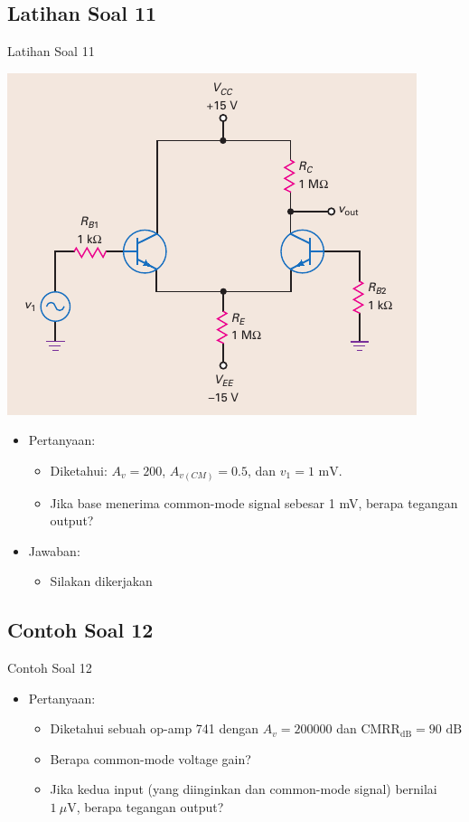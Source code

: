 \documentclass[aspectratio=169]{beamer}
\begin{document}
\subsection{Latihan Soal 11}
\begin{frame}{Latihan Soal 11}
	\begin{multicols}{2}
		\begin{center}
			\includegraphics[height=0.7\textheight]{gambar/01.fig22}
		\end{center}
		\columnbreak
		\begin{itemize}
			\item Pertanyaan:
			\begin{itemize}
				\item Diketahui: $ A_v = 200 $, $ A_{v(CM)} = 0.5 $, dan $ v_1 = 1 \text{ mV} $.
				\item Jika base menerima common-mode signal sebesar 1 mV, berapa tegangan output?
			\end{itemize}
			\item Jawaban:
			\begin{itemize}
				\item Silakan dikerjakan
			\end{itemize}
		\end{itemize}
	\end{multicols}
\end{frame}

\subsection{Contoh Soal 12}
\begin{frame}{Contoh Soal 12}
	\begin{itemize}
		\item Pertanyaan:
		\begin{itemize}
			\item Diketahui sebuah op-amp 741 dengan $ A_v = 200000 $ dan $ \text{CMRR}_\text{dB} = 90 \text{ dB}$
			\item Berapa common-mode voltage gain?
			\item Jika kedua input (yang diinginkan dan common-mode signal) bernilai $ 1~\mu\text{V} $, berapa tegangan output?
		\end{itemize}
	\end{itemize}
\end{frame}
\end{document}

